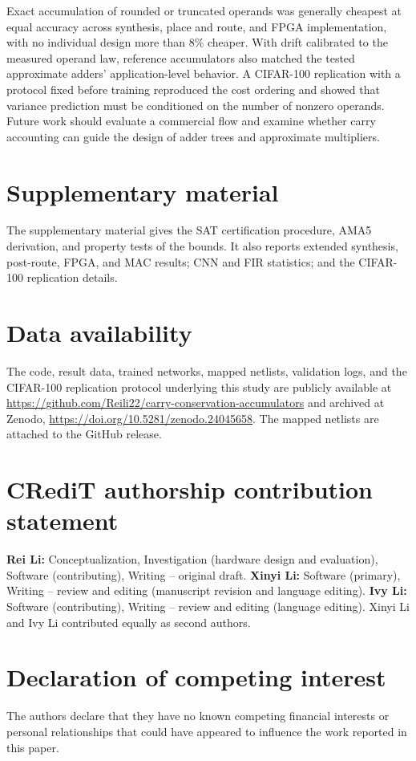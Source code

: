 \documentclass[preprint,12pt,numbers]{elsarticle}
\theoremstyle{definition}
\begin{document}
Exact accumulation of rounded or truncated operands was generally
cheapest at equal accuracy across synthesis, place and route, and
FPGA implementation, with no individual design more than 8\% cheaper.
With drift calibrated to the measured operand law, reference
accumulators also matched the tested approximate adders'
application-level behavior. A CIFAR-100 replication with a
protocol fixed before training reproduced the cost ordering and
showed that variance prediction must be conditioned on the
number of nonzero operands. Future work should evaluate a commercial
flow and examine whether carry accounting can guide the design of
adder trees and approximate multipliers.

\section*{Supplementary material}
The supplementary material gives the SAT certification procedure,
AMA5 derivation, and property tests of the bounds. It also reports
extended synthesis, post-route, FPGA, and MAC results; CNN and FIR
statistics; and the CIFAR-100 replication details.

\section*{Data availability}
The code, result data, trained networks, mapped netlists, validation logs,
and the CIFAR-100 replication protocol underlying this study are publicly
available at
\url{https://github.com/Reili22/carry-conservation-accumulators} and
archived at Zenodo, \url{https://doi.org/10.5281/zenodo.24045658}. The
mapped netlists are attached to the GitHub release.

\section*{CRediT authorship contribution statement}
\textbf{Rei Li:} Conceptualization, Investigation (hardware design and
evaluation), Software (contributing), Writing -- original draft.
\textbf{Xinyi Li:} Software (primary), Writing -- review and editing
(manuscript revision and language editing).
\textbf{Ivy Li:} Software (contributing), Writing -- review and editing
(language editing).
Xinyi Li and Ivy Li contributed equally as second authors.

\section*{Declaration of competing interest}
The authors declare that they have no known competing financial interests
or personal relationships that could have appeared to influence the work
reported in this paper.
\end{document}
